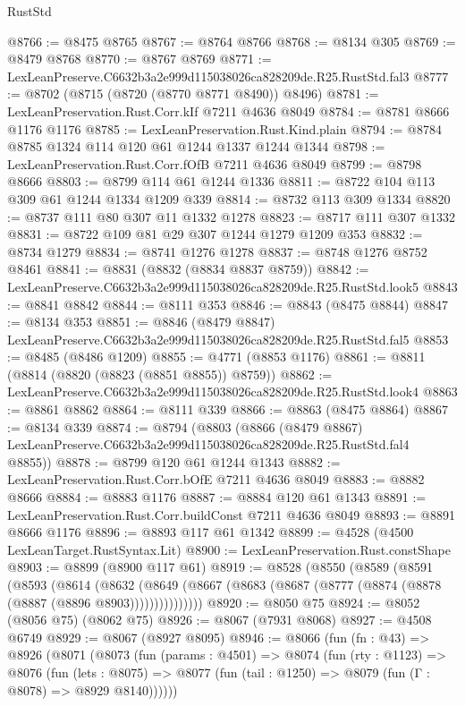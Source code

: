 \begin{lexlean}{RustStd}
\begin{coremodule}
@8766 := @8475 @8765
@8767 := @8764 @8766
@8768 := @8134 @305
@8769 := @8479 @8768
@8770 := @8767 @8769
@8771 := LexLeanPreserve.C6632b3a2e999d115038026ca828209de.R25.RustStd.fal3
@8777 := @8702 (@8715 (@8720 (@8770 @8771 @8490)) @8496)
@8781 := LexLeanPreservation.Rust.Corr.kIf @7211 @4636 @8049
@8784 := @8781 @8666 @1176 @1176
@8785 := LexLeanPreservation.Rust.Kind.plain
@8794 := @8784 @8785 @1324 @114 @120 @61 @1244 @1337 @1244 @1344
@8798 := LexLeanPreservation.Rust.Corr.fOfB @7211 @4636 @8049
@8799 := @8798 @8666
@8803 := @8799 @114 @61 @1244 @1336
@8811 := @8722 @104 @113 @309 @61 @1244 @1334 @1209 @339
@8814 := @8732 @113 @309 @1334
@8820 := @8737 @111 @80 @307 @11 @1332 @1278
@8823 := @8717 @111 @307 @1332
@8831 := @8722 @109 @81 @29 @307 @1244 @1279 @1209 @353
@8832 := @8734 @1279
@8834 := @8741 @1276 @1278
@8837 := @8748 @1276 @8752 @8461
@8841 := @8831 (@8832 (@8834 @8837 @8759))
@8842 := LexLeanPreserve.C6632b3a2e999d115038026ca828209de.R25.RustStd.look5
@8843 := @8841 @8842
@8844 := @8111 @353
@8846 := @8843 (@8475 @8844)
@8847 := @8134 @353
@8851 := @8846 (@8479 @8847) LexLeanPreserve.C6632b3a2e999d115038026ca828209de.R25.RustStd.fal5
@8853 := @8485 (@8486 @1209)
@8855 := @4771 (@8853 @1176)
@8861 := @8811 (@8814 (@8820 (@8823 (@8851 @8855)) @8759))
@8862 := LexLeanPreserve.C6632b3a2e999d115038026ca828209de.R25.RustStd.look4
@8863 := @8861 @8862
@8864 := @8111 @339
@8866 := @8863 (@8475 @8864)
@8867 := @8134 @339
@8874 := @8794
    (@8803
      (@8866
        (@8479 @8867)
        LexLeanPreserve.C6632b3a2e999d115038026ca828209de.R25.RustStd.fal4
        @8855))
@8878 := @8799 @120 @61 @1244 @1343
@8882 := LexLeanPreservation.Rust.Corr.bOfE @7211 @4636 @8049
@8883 := @8882 @8666
@8884 := @8883 @1176
@8887 := @8884 @120 @61 @1343
@8891 := LexLeanPreservation.Rust.Corr.buildConst @7211 @4636 @8049
@8893 := @8891 @8666 @1176
@8896 := @8893 @117 @61 @1342
@8899 := @4528 (@4500 LexLeanTarget.RustSyntax.Lit)
@8900 := LexLeanPreservation.Rust.constShape
@8903 := @8899 (@8900 @117 @61)
@8919 := @8528
    (@8550
      (@8589
        (@8591
          (@8593
            (@8614
              (@8632
                (@8649 (@8667 (@8683 (@8687 (@8777 (@8874 (@8878 (@8887 (@8896 @8903)))))))))))))))
@8920 := @8050 @75
@8924 := @8052 (@8056 @75) (@8062 @75)
@8926 := @8067 (@7931 @8068)
@8927 := @4508 @6749
@8929 := @8067 (@8927 @8095)
@8946 := @8066
    (fun (fn : @43) =>
    @8926
      (@8071
        (@8073
          (fun (params : @4501) =>
          @8074
            (fun (rty : @1123) =>
            @8076
              (fun (lets : @8075) =>
              @8077 (fun (tail : @1250) => @8079 (fun (Γ : @8078) => @8929 @8140))))))

\end{coremodule}
\end{lexlean}
